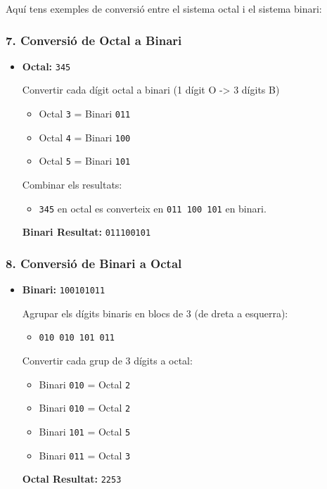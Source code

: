 \documentclass[
  12 pt,
  a4paper,
]{article}
\providecommand{\tightlist}{%
  \setlength{\itemsep}{0pt}\setlength{\parskip}{0pt}}
\begin{document}
Aquí tens exemples de conversió entre el sistema octal i el sistema
binari:

\subsubsection{7. Conversió de Octal a
Binari}\label{conversiuxf3-de-octal-a-binari}

\begin{itemize}
\item
  \textbf{Octal:} \texttt{345}

  Convertir cada dígit octal a binari (1 dígit O -\textgreater{} 3
  dígits B)

  \begin{itemize}
  \tightlist
  \item
    Octal \texttt{3} = Binari \texttt{011}
  \item
    Octal \texttt{4} = Binari \texttt{100}
  \item
    Octal \texttt{5} = Binari \texttt{101}
  \end{itemize}

  Combinar els resultats:

  \begin{itemize}
  \tightlist
  \item
    \texttt{345} en octal es converteix en \texttt{011\ 100\ 101} en
    binari.
  \end{itemize}

  \textbf{Binari Resultat:} \texttt{011100101}
\end{itemize}

\subsubsection{8. Conversió de Binari a
Octal}\label{conversiuxf3-de-binari-a-octal}

\begin{itemize}
\item
  \textbf{Binari:} \texttt{100101011}

  Agrupar els dígits binaris en blocs de 3 (de dreta a esquerra):

  \begin{itemize}
  \tightlist
  \item
    \texttt{010\ 010\ 101\ 011}
  \end{itemize}

  Convertir cada grup de 3 dígits a octal:

  \begin{itemize}
  \tightlist
  \item
    Binari \texttt{010} = Octal \texttt{2}
  \item
    Binari \texttt{010} = Octal \texttt{2}
  \item
    Binari \texttt{101} = Octal \texttt{5}
  \item
    Binari \texttt{011} = Octal \texttt{3}
  \end{itemize}

  \textbf{Octal Resultat:} \texttt{2253}
\end{itemize}
\end{document}
